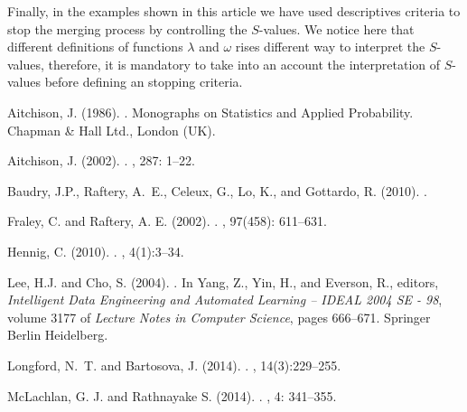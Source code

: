 \documentclass[10pt, a4paper]{article}
\theoremstyle{definition}
\begin{document}
\begin{spacing}{1.9}
Finally, in the examples shown in this article we have used descriptives criteria to stop the merging process by controlling the $S$-values. We notice here that different definitions of functions $\lambda$ and $\omega$ rises different way to interpret the $S$-values, therefore, it is mandatory to take into an account the interpretation of $S$-values before defining an stopping criteria.

\newpage


\begin{thebibliography}{}

Aitchison, J. (1986).
.
\newblock Monographs on Statistics and Applied Probability. Chapman \& Hall
  Ltd., London (UK).

Aitchison, J. (2002).
.
, 287: 1--22.

Baudry, J.P., Raftery, A.~E., Celeux, G., Lo, K., and Gottardo, R. (2010).
.

Fraley, C. and Raftery, A. E. (2002).
.
, 97(458): 611–631.

Hennig, C. (2010).
.
, 4(1):3--34.

Lee, H.J. and Cho, S. (2004).
.
\newblock In Yang, Z., Yin, H., and Everson, R., editors, {\em Intelligent Data
  Engineering and Automated Learning – IDEAL 2004 SE - 98}, volume 3177 of
  {\em Lecture Notes in Computer Science}, pages 666--671. Springer Berlin
  Heidelberg.

Longford, N.~T. and Bartosova, J. (2014).
.
, 14(3):229--255.


McLachlan, G. J. and Rathnayake S. (2014).
.
,  4: 341–355.


\end{thebibliography}
\end{spacing}
\end{document}
